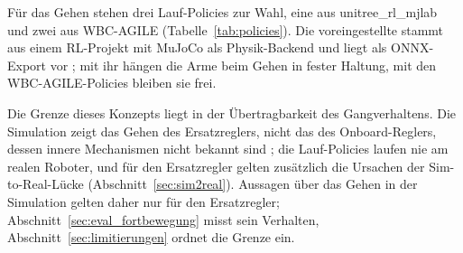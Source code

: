 Für das Gehen stehen drei Lauf-Policies zur Wahl, eine aus unitree\_rl\_mjlab und zwei aus WBC-AGILE (Tabelle~\ref{tab:policies}).
Die voreingestellte stammt aus einem RL-Projekt mit MuJoCo als Physik-Backend \cite{UnitreeRLMjlab} und liegt als ONNX-Export vor \cite{UnitreeRLMjlab}; mit ihr hängen die Arme beim Gehen in fester Haltung, mit den WBC-AGILE-Policies bleiben sie frei.

Die Grenze dieses Konzepts liegt in der Übertragbarkeit des Gangverhaltens.
Die Simulation zeigt das Gehen des Ersatzreglers, nicht das des Onboard-Reglers, dessen innere Mechanismen nicht bekannt sind \cite{Hu2026}; die Lauf-Policies laufen nie am realen Roboter, und für den Ersatzregler gelten zusätzlich die Ursachen der Sim-to-Real-Lücke (Abschnitt~\ref{sec:sim2real}).
Aussagen über das Gehen in der Simulation gelten daher nur für den Ersatzregler; Abschnitt~\ref{sec:eval_fortbewegung} misst sein Verhalten, Abschnitt~\ref{sec:limitierungen} ordnet die Grenze ein.
